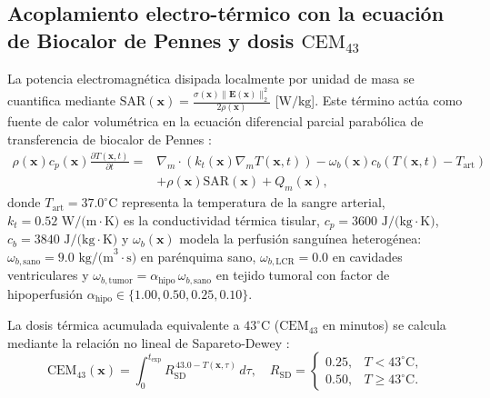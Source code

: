 \documentclass[9pt]{article}
\begin{document}
\subsection{Acoplamiento electro-térmico con la ecuación de Biocalor de Pennes y dosis \texorpdfstring{$\text{CEM}_{43}$}{CEM43}}
La potencia electromagnética disipada localmente por unidad de masa se cuantifica mediante $\text{SAR}(\mathbf{x}) = \frac{\sigma(\mathbf{x})\|\mathbf{E}(\mathbf{x})\|_2^2}{2\rho(\mathbf{x})}$ [$\text{W/kg}$]. Este término actúa como fuente de calor volumétrica en la ecuación diferencial parcial parabólica de transferencia de biocalor de Pennes \parencite{Pennes1948}:
\begin{equation}
\begin{aligned}
\rho(\mathbf{x}) c_p(\mathbf{x}) \frac{\partial T(\mathbf{x}, t)}{\partial t} ={}& \nabla_m \cdot \left( k_t(\mathbf{x}) \nabla_m T(\mathbf{x}, t) \right) - \omega_b(\mathbf{x}) c_b \left( T(\mathbf{x}, t) - T_{\text{art}} \right) \\
& + \rho(\mathbf{x}) \text{SAR}(\mathbf{x}) + Q_m(\mathbf{x}),
\end{aligned}
\label{eq:pennes}
\end{equation}
donde $T_{\text{art}} = 37.0^\circ\text{C}$ representa la temperatura de la sangre arterial, $k_t = 0.52\text{ W/(m}\cdot\text{K)}$ es la conductividad térmica tisular, $c_p = 3600\text{ J/(kg}\cdot\text{K)}$, $c_b = 3840\text{ J/(kg}\cdot\text{K)}$ y $\omega_b(\mathbf{x})$ modela la perfusión sanguínea heterogénea: $\omega_{b,\text{sano}} = 9.0\text{ kg/(m}^3\cdot\text{s)}$ en parénquima sano, $\omega_{b,\text{LCR}} = 0.0$ en cavidades ventriculares y $\omega_{b,\text{tumor}} = \alpha_{\text{hipo}}\,\omega_{b,\text{sano}}$ en tejido tumoral con factor de hipoperfusión $\alpha_{\text{hipo}} \in \{1.00, 0.50, 0.25, 0.10\}$.

La dosis térmica acumulada equivalente a $43^\circ\text{C}$ ($\text{CEM}_{43}$ en minutos) se calcula mediante la relación no lineal de Sapareto-Dewey \parencite{Sapareto1984}:
\begin{equation}
\text{CEM}_{43}(\mathbf{x}) = \int_0^{t_{\text{exp}}} R_{\text{SD}}^{\,43.0 - T(\mathbf{x}, \tau)} \, d\tau, \quad R_{\text{SD}} = \begin{cases} 0.25, & T < 43^\circ\text{C}, \\ 0.50, & T \ge 43^\circ\text{C}. \end{cases}
\end{equation}
\end{document}
